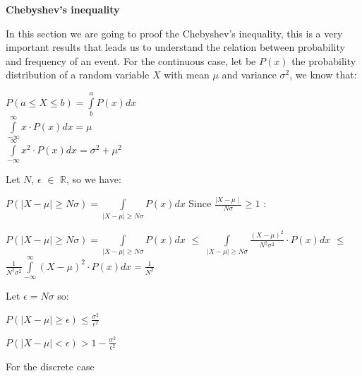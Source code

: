 \documentclass[paper=9in:6in,pagesize=pdftex,headinclude=on,footinclude=on,10pt,bibtotoc,pointlessnumbers,normalheadings,DIV=9,twoside=false]{scrbook}
\begin{document}
\date{}

\begin{center}
\begin{large}
 \textbf{Chebyshev's inequality \\}
\end{large}
\end{center}

\begin{text} 
 In this section we are going to proof the Chebyshev's inequality, this is a very important results that leads us to understand the relation between probability and frequency of an event. For the continuous case,  let be $P(x)$ the probability distribution of a random variable $X$ with mean $\mu$ and variance $\sigma^2$, we know that:
\end{text}

\begin{center}
    $P(a \leq X \leq b) = \int\limits_{b}^{a} P(x) dx$ \\
    $\int\limits_{-\infty}^{\infty} x \cdot P(x) dx = \mu $ \\
    $\int\limits_{-\infty}^{\infty} x^2 \cdot P(x) dx = \sigma^2 + \mu^2$
\end{center}

\begin{text}
Let $N$, $\epsilon$ $\in$ $\mathbb{R}$, so we have:
\end{text}

\begin{center}
$P(\mid X- \mu \mid \geq N \sigma)= \int\limits_{\mid X- \mu \mid \geq N \sigma}^{} P(x)  dx$ \hspace{2cm} Since $\frac{\mid X- \mu \mid}{N \sigma} \geq 1$ :

$P(\mid X- \mu \mid \geq N \sigma)= \int\limits_{\mid X- \mu \mid \geq N \sigma}^{} P(x)  dx$ $\leq$ $ \int\limits_{\mid X- \mu \mid \geq N \sigma}^{} \frac{(X- \mu)^2}{N^2 \sigma^2} \cdot P(x)  dx$ $\leq$ $\frac{1}{N^2 \sigma^2}\int\limits_{-\infty}^{\infty} (X- \mu)^2 \cdot P(x)  dx = \frac{1}{N^2}$
\end{center}

\begin{text}
Let $\epsilon = N\sigma$ so: \\
\end{text}

\begin{center}
   $ P(\mid X- \mu \mid \geq \epsilon) \leq \frac{\sigma^2}{\epsilon^2}$ \\
   \end{center}
   
   \begin{center}
   $P(\mid X- \mu \mid < \epsilon) > 1 -  \frac{\sigma^2}{\epsilon^2}$
    \end{center}
    
    \begin{text}
    For the discrete case
    \end{text}
\end{document}
